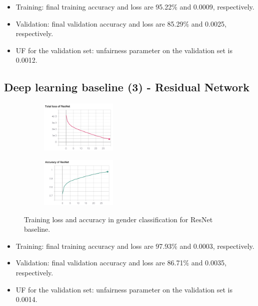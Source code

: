 \begin{itemize}
\item Training: final training accuracy and loss are 95.22$\%$ and 0.0009, respectively.  

\item Validation: final validation accuracy and loss are 85.29$\%$ and 0.0025, respectively.

\item UF for the validation set: unfairness parameter on the validation set is 0.0012.   
\end{itemize}


\subsection{Deep learning baseline (3) - Residual Network}

\begin{figure}[H]
	\centering
	\begin{subfigure}
		\centering
		\includegraphics[width=0.4\textwidth]{figure/resnet-loss.png}
	\end{subfigure}
	\quad
	\begin{subfigure}
		\centering
		\includegraphics[width=0.4\textwidth]{figure/resnet-ac.png}
	\end{subfigure}
	\caption{Training loss and accuracy in gender classification for ResNet baseline.}
	\label{fig: resnet}
\end{figure}

\begin{itemize}
\item Training: final training accuracy and loss are 97.93$\%$ and 0.0003, respectively.  

\item Validation: final validation accuracy and loss are 86.71$\%$ and 0.0035, respectively.

\item UF for the validation set: unfairness parameter on the validation set is 0.0014.   
\end{itemize}


